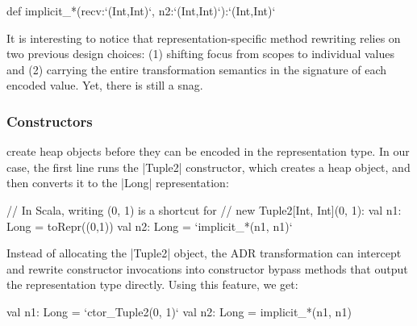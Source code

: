\begin{lstlisting-nobreak}
def implicit_*(recv:`(Int,Int)`, n2:`(Int,Int)`):`(Int,Int)`
\end{lstlisting-nobreak}

It is interesting to notice that representation-specific method rewriting relies on two previous design choices: (1) shifting focus from scopes to individual values and (2) carrying the entire transformation semantics in the signature of each encoded value. %
%
Yet, there is still a snag.

\subsubsection{Constructors} create heap objects before they can be encoded in the representation type. In our case, the first line runs the |Tuple2| constructor, which creates a heap object, and then converts it to the |Long| representation:

\begin{lstlisting-nobreak}
// In Scala, writing (0, 1) is a shortcut for
// new Tuple2[Int, Int](0, 1):
val n1: Long = toRepr((0,1))
val n2: Long = `implicit_*(n1, n1)`
\end{lstlisting-nobreak}

Instead of allocating the |Tuple2| object, the ADR transformation can intercept and rewrite constructor invocations into constructor bypass methods that output the representation type directly. Using this feature, we get:

\begin{lstlisting-nobreak}
val n1: Long = `ctor_Tuple2(0, 1)`
val n2: Long = implicit_*(n1, n1)
\end{lstlisting-nobreak}


